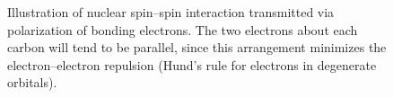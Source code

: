 \begin{figure}[t]
	\centering
		\captionsetup[subfigure]{farskip=20pt, captionskip=20pt}
		\hspace*{\fill}%
		\hfill%
		\hspace*{\fill}%
	\caption{Illustration of nuclear spin--spin interaction transmitted via polarization of bonding electrons. 
	The two electrons about each carbon will tend to be parallel, since this arrangement minimizes the electron--electron repulsion (Hund's rule for electrons in degenerate orbitals).}
	\label{fig:j_coupling}
\end{figure}


